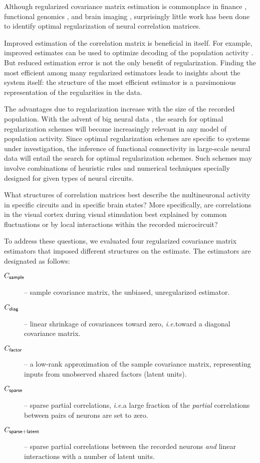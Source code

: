 Although regularized covariance matrix estimation is commonplace in finance \citep{Ledoit:2003}, functional genomics \citep{Schafer:2005}, and brain imaging \citep{Ryali:2012}, surprisingly little work has been done to identify optimal regularization of neural correlation matrices.

Improved estimation of the correlation matrix is beneficial in itself. For example, improved estimates can be used to optimize  decoding of the population activity \citep{Friedman:1989}. But reduced estimation error is not the only benefit of regularization.  Finding the most efficient among many regularized estimators leads to insights about the system itself: the structure of the most efficient estimator is a parsimonious representation of the regularities in the data.

The advantages due to regularization increase with the size of the recorded population. With the advent of  big neural data \citep{Alivisatos:2013}, the search for optimal regularization schemes will become increasingly relevant in any model of population activity. Since optimal regularization schemes are specific to systems under investigation, the inference of functional connectivity in large-scale neural data will entail the search for optimal regularization schemes. Such schemes may involve combinations of heuristic rules and numerical techniques specially designed for given types of neural circuits.

What structures of correlation matrices best describe the multineuronal activity in specific circuits and in specific brain states?  More specifically, are correlations in the visual cortex during visual stimulation best explained by common fluctuations or by local interactions within the recorded microcircuit?

To address these questions, we evaluated four regularized covariance matrix estimators that imposed different structures on the estimate. The estimators are designated as follows:
\begin{description}
\item[$C_{\sf sample}$] -- sample covariance matrix, the unbiased, unregularized estimator.
\item[$C_{\sf diag}$] -- linear shrinkage of covariances toward zero, \emph{i.e.}\;toward a diagonal covariance matrix.
\item[$C_{\sf factor}$] -- a low-rank approximation of the sample covariance matrix, representing inputs from unobserved shared factors (latent units).
\item[$C_{\sf sparse}$] -- sparse partial correlations, \emph{i.e.}\;a large fraction of the \emph{partial} correlations between pairs of neurons are set to zero.
\item[$C_{\sf sparse+latent}$] -- sparse partial correlations between the recorded neurons \emph{and} linear interactions with a number of latent units.
\end{description}

